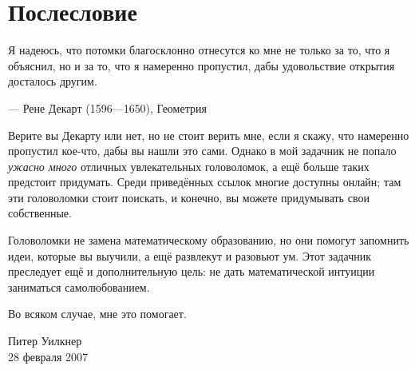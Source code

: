 \chapter{Послесловие}


\setlength{\epigraphwidth}{.83\textwidth}
\epigraph{Я надеюсь, что потомки благосклонно отнесутся ко мне не только за то, что я объяснил, но и за то, что я намеренно пропустил, дабы удовольствие открытия досталось другим.}{--- Рене Декарт (1596---1650), Геометрия}


Верите вы Декарту или нет, но не стоит верить мне, если я скажу, что намеренно пропустил кое-что, дабы вы нашли это сами.
Однако в мой задачник не попало \emph{ужасно много} отличных увлекательных головоломок, а ещё больше таких предстоит придумать.
Среди приведённых ссылок многие доступны онлайн; там эти головоломки стоит поискать, и конечно, вы можете придумывать свои собственные.

Головоломки не замена математическому образованию, но они помогут запомнить идеи, которые вы выучили, а ещё развлекут и разовьют ум.
Этот задачник преследует ещё и дополнительную цель:
не дать математической интуиции заниматься самолюбованием.

Во всяком случае, мне это помогает.

\begin{flushright}
Питер Уилкнер\\
28 февраля 2007
\end{flushright}

